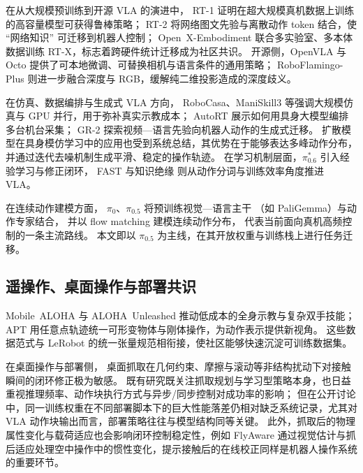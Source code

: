 在从大规模预训练到开源 VLA 的演进中，
RT-1\cite{brohan2022rt1} 证明在超大规模真机数据上训练的高容量模型可获得鲁棒策略；
RT-2\cite{brohan2023rt2} 将网络图文先验与离散动作 token 结合，使 ``网络知识'' 可迁移到机器人控制；
Open~X-Embodiment\cite{oneill2024openxembodiment} 联合多实验室、多本体数据训练 RT-X，标志着跨硬件统计迁移成为社区共识。
开源侧，OpenVLA\cite{kim2024openvla} 与 Octo\cite{ghosh2024octo} 提供了可本地微调、可替换相机与语言条件的通用策略；
RoboFlamingo-Plus\cite{wang2025roboflamingoplus} 则进一步融合深度与 RGB，缓解纯二维投影造成的深度歧义。

在仿真、数据编排与生成式 VLA 方向，
RoboCasa\cite{nasiriany2024robocasa}、ManiSkill3\cite{taole2024maniskill3} 等强调大规模仿真与 GPU 并行，用于弥补真实示教成本；
AutoRT\cite{ahn2024autort} 展示如何用具身大模型编排多台机台采集；
GR-2\cite{cheang2024gr2} 探索视频—语言先验向机器人动作的生成式迁移。
扩散模型在具身模仿学习中的应用也受到系统总结，其优势在于能够表达多峰动作分布，并通过迭代去噪机制生成平滑、稳定的操作轨迹\cite{li2026diffusionEmbodiedImitationLearningReview}。
在学习机制层面，$\pi^*_{0.6}$\cite{physicalintelligence2025pi06} 引入经验学习与修正闭环，
FAST\cite{pertsch2025fast} 与知识绝缘\cite{driess2025knowledge} 则从动作分词与训练效率角度推进 VLA。

在连续动作建模方面，
$\pi_0$\cite{black2024pi0}、$\pi_{0.5}$\cite{black2025pi05} 将预训练视觉—语言主干
（如 PaliGemma\allowbreak\cite{beyer2024paligemma}）与动作专家结合，
并以 flow matching\cite{lipman2022flowmatching} 建模连续动作分布，
代表当前面向真机高频控制的一条主流路线。
本文即以 $\pi_{0.5}$ 为主线，在其开放权重与训练栈上进行任务迁移。

\subsection{遥操作、桌面操作与部署共识}

Mobile~ALOHA\cite{fu2024mobilealoha} 与 ALOHA~Unleashed\cite{zhao2024alohaunleashed} 推动低成本的全身示教与复杂双手技能；
APT\cite{wen2023apt} 用任意点轨迹统一可形变物体与刚体操作，为动作表示提供新视角。
这些数据范式与 LeRobot 的统一张量规范相衔接，使社区能够快速沉淀可训练数据集。

在桌面操作与部署侧，
桌面抓取在几何约束、摩擦与滚动等非结构扰动下对接触瞬间的闭环修正极为敏感。
既有研究既关注抓取规划与学习型策略本身，也日益重视推理频率、动作块执行方式与异步/同步控制对成功率的影响；
但在公开讨论中，同一训练权重在不同部署脚本下的巨大性能落差仍相对缺乏系统记录，尤其对 VLA 动作块输出而言，部署策略往往与模型结构同等关键。
此外，抓取后的物理属性变化与载荷适应也会影响闭环控制稳定性，例如 FlyAware\cite{ye2026flyaware} 通过视觉估计与抓后适应处理空中操作中的惯性变化，提示接触后的在线校正同样是机器人操作系统的重要环节。

